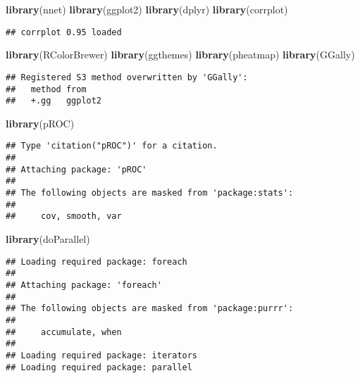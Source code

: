 \documentclass[
]{article}
\newenvironment{Shaded}{\begin{snugshade}}{\end{snugshade}}
\newcommand{\FunctionTok}[1]{\textcolor[rgb]{0.13,0.29,0.53}{\textbf{#1}}}
\newcommand{\NormalTok}[1]{#1}
\begin{document}
\begin{Shaded}
\begin{Highlighting}[]
\FunctionTok{library}\NormalTok{(nnet)       }
\FunctionTok{library}\NormalTok{(ggplot2)}
\FunctionTok{library}\NormalTok{(dplyr)}
\FunctionTok{library}\NormalTok{(corrplot)  }
\end{Highlighting}
\end{Shaded}

\begin{verbatim}
## corrplot 0.95 loaded
\end{verbatim}

\begin{Shaded}
\begin{Highlighting}[]
\FunctionTok{library}\NormalTok{(RColorBrewer)  }
\FunctionTok{library}\NormalTok{(ggthemes)      }
\FunctionTok{library}\NormalTok{(pheatmap)      }
\FunctionTok{library}\NormalTok{(GGally)        }
\end{Highlighting}
\end{Shaded}

\begin{verbatim}
## Registered S3 method overwritten by 'GGally':
##   method from   
##   +.gg   ggplot2
\end{verbatim}

\begin{Shaded}
\begin{Highlighting}[]
\FunctionTok{library}\NormalTok{(pROC)          }
\end{Highlighting}
\end{Shaded}

\begin{verbatim}
## Type 'citation("pROC")' for a citation.
## 
## Attaching package: 'pROC'
## 
## The following objects are masked from 'package:stats':
## 
##     cov, smooth, var
\end{verbatim}

\begin{Shaded}
\begin{Highlighting}[]
\FunctionTok{library}\NormalTok{(doParallel)    }
\end{Highlighting}
\end{Shaded}

\begin{verbatim}
## Loading required package: foreach
## 
## Attaching package: 'foreach'
## 
## The following objects are masked from 'package:purrr':
## 
##     accumulate, when
## 
## Loading required package: iterators
## Loading required package: parallel
\end{verbatim}
\end{document}
